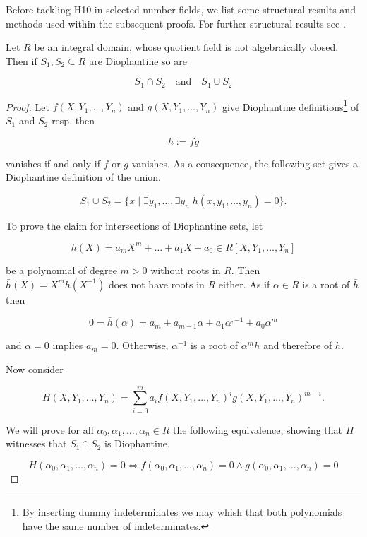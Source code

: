 
Before tackling \textsc{H10} in selected number fields, we list some
structural results and methods used within the subsequent proofs. For
further structural results see \cite{Shlapentokh2000}.

\begin{lem}\label{lem:intersections and unions}
    Let $R$ be an integral domain, whose quotient field is not
    algebraically closed. Then if $S_1, S_2 \subseteq R$ are Diophantine so are

    \[ S_1 ∩ S_2 \quad \text{and} \quad S_1 ∪ S_2 \]
\end{lem}

\begin{proof}
Let $f(X, Y_1, …, Y_n)$ and $g(X, Y_1, …, Y_n)$ give Diophantine
definitions\footnote{By inserting dummy indeterminates we may whish that
both polynomials have the same number of indeterminates.} of $S_1$
and $S_2$ resp. then

\[ h := fg \]

vanishes if and only if $f$ or $g$ vanishes. As a consequence, the
following set gives a Diophantine definition of the union.

\[ S_1 ∪ S_2 = \lbrace x \mid ∃ y_1, … , ∃ y_n \; h(x, y_1, … , y_n) = 0 \rbrace. \]

To prove the claim for intersections of Diophantine sets, let

\[h(X) = a_m X^m + … + a_1 X + a_0 ∈ R[X, Y_1, …, Y_n]\]

be a polynomial of degree $m > 0$ without roots in $R$. Then
$\bar h(X) = X^m h(X^{-1})$ does not have roots in $R$ either. As if
$α ∈ R$ is a root of $\bar h$ then

\[ 0 = \bar h(α) = a_m + a_{m-1} α + a_1 α^{,-1} + a_0 α^m\]

and $α = 0$ implies $a_m = 0$. Otherwise, $α^{-1}$ is a root of
$α^m h$ and therefore of $h$.

Now consider

\[ H(X, Y_1, …, Y_n) = \sum_{i=0}^m a_i f(X, Y_1, …, Y_n)^i g(X, Y_1, …, Y_n)^{m - i}.\]

We will prove for all $α_0, α_1, …, α_n ∈ R$ the following
equivalence, showing that $H$ witnesses that $S_1 ∩ S_2$ is
Diophantine.

\[ H(α_0, α_1, …, α_n) = 0 \Leftrightarrow f(α_0, α_1, …, α_n) = 0 ∧ g(α_0, α_1, …, α_n) = 0 \]


\end{proof}
